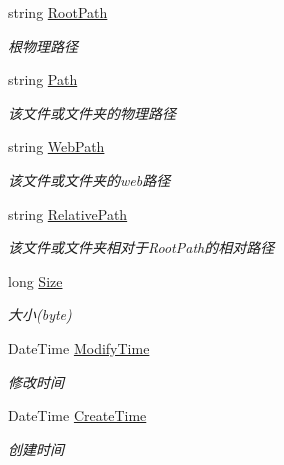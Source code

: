 \begin{DoxyCompactItemize}
string \hyperlink{class_x_c_l_net_tools_1_1_entity_1_1_file_info_entity_a6ef4c659747c605379a43168ae1d64f6}{Root\-Path}
\begin{DoxyCompactList}\small\item\em 根物理路径 \end{DoxyCompactList}\item 
string \hyperlink{class_x_c_l_net_tools_1_1_entity_1_1_file_info_entity_a67f485c1a1af6205351305756d515e98}{Path}
\begin{DoxyCompactList}\small\item\em 该文件或文件夹的物理路径 \end{DoxyCompactList}\item 
string \hyperlink{class_x_c_l_net_tools_1_1_entity_1_1_file_info_entity_ab93bd802770bb40cc0abdfd35d2fbbc6}{Web\-Path}
\begin{DoxyCompactList}\small\item\em 该文件或文件夹的web路径 \end{DoxyCompactList}\item 
string \hyperlink{class_x_c_l_net_tools_1_1_entity_1_1_file_info_entity_a795982d186fa2d1ef0e3fb51705f36b2}{Relative\-Path}
\begin{DoxyCompactList}\small\item\em 该文件或文件夹相对于\-Root\-Path的相对路径 \end{DoxyCompactList}\item 
long \hyperlink{class_x_c_l_net_tools_1_1_entity_1_1_file_info_entity_a7447a43994e75793388e160a626ba346}{Size}
\begin{DoxyCompactList}\small\item\em 大小(byte) \end{DoxyCompactList}\item 
Date\-Time \hyperlink{class_x_c_l_net_tools_1_1_entity_1_1_file_info_entity_a64c6633bec7e4d547632c122dbaad9f8}{Modify\-Time}
\begin{DoxyCompactList}\small\item\em 修改时间 \end{DoxyCompactList}\item 
Date\-Time \hyperlink{class_x_c_l_net_tools_1_1_entity_1_1_file_info_entity_a93fc7b2a3119885d9449d1817e7306ca}{Create\-Time}
\begin{DoxyCompactList}\small\item\em 创建时间 \end{DoxyCompactList}\end{DoxyCompactItemize}



